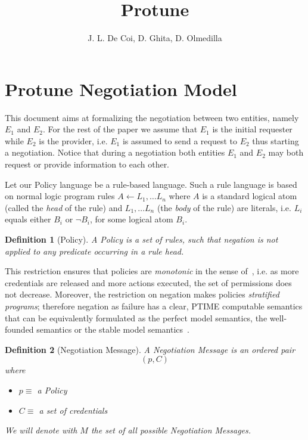 \documentclass{article}
\title{Protune}
\author{J. L. De Coi, D. Ghita, D. Olmedilla}
\newtheorem{definition}{Definition} %
\begin{document}
\maketitle

\section{Protune Negotiation Model}

This document aims at formalizing the negotiation between two entities, namely $E_1$ and $E_2$. For the rest of the paper we assume that $E_1$ is the initial requester while $E_2$ is the provider, i.e. $E_1$ is assumed to send a request to $E_2$ thus starting a negotiation. Notice that during a negotiation both entities $E_1$ and $E_2$ may both request or provide information to each other.

Let our Policy language be a rule-based language. Such a rule language is based on normal logic program rules $ A \leftarrow L_{1}, \ldots L_{n}$ where $A$ is a standard logical atom (called the \textit{head} of the rule) and $L_1, \ldots L_n$ (the \textit{body} of the rule) are literals, i.e. $L_{i}$ equals either $B_{i}$ or $\neg B_{i}$, for some logical atom $B_{i}$.

\begin{definition}[Policy]
A Policy is a set of rules, such that negation is not applied to any predicate occurring in a rule head.
\end{definition}

This restriction ensures that policies are \emph{monotonic} in the sense of~\cite{swyyj02}, i.e. as more credentials are released and more actions executed, the set of permissions does not decrease. Moreover, the restriction on negation makes policies \textit{stratified programs}; therefore negation as failure has a clear, PTIME computable semantics that can be equivalently formulated as the perfect model semantics, the well-founded semantics or the stable model semantics~\cite{baral-book}.

\begin{definition}[Negotiation Message]
A Negotiation Message is an ordered pair
$$(p, C)$$
where
  \begin{itemize}
	\item $p \equiv$ a Policy
	\item $C \equiv$ a set of credentials
  \end{itemize}
We will denote with $M$ the set of all possible Negotiation Messages.
\end{definition}
\end{document}
